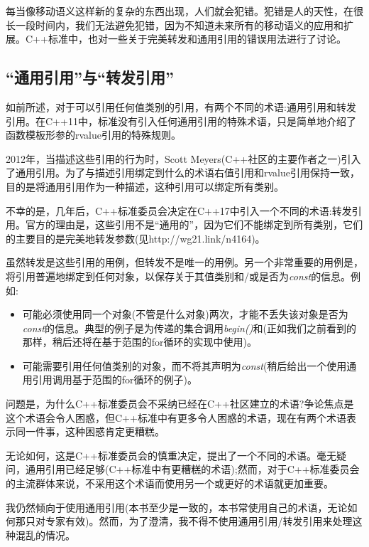 每当像移动语义这样新的复杂的东西出现，人们就会犯错。犯错是人的天性，在很长一段时间内，我们无法避免犯错，因为不知道未来所有的移动语义的应用和扩展。C++标准中，也对一些关于完美转发和通用引用的错误用法进行了讨论。

\subsection{“通用引用”与“转发引用”}

如前所述，对于可以引用任何值类别的引用，有两个不同的术语:通用引用和转发引用。在C++11中，标准没有引入任何通用引用的特殊术语，只是简单地介绍了函数模板形参的rvalue引用的特殊规则。

2012年，当描述这些引用的行为时，Scott Meyers(C++社区的主要作者之一)引入了通用引用。为了与描述引用绑定到什么的术语右值引用和rvalue引用保持一致，目的是将通用引用作为一种描述，这种引用可以绑定所有类别。

不幸的是，几年后，C++标准委员会决定在C++17中引入一个不同的术语:转发引用。官方的理由是，这些引用不是“通用的”，因为它们不能绑定到所有类别，它们的主要目的是完美地转发参数(见http://wg21.link/n4164)。

虽然转发是这些引用的用例，但转发不是唯一的用例。另一个非常重要的用例是，将引用普遍地绑定到任何对象，以保存关于其值类别和/或是否为\textit{const}的信息。例如:

\begin{itemize}
	\item 可能必须使用同一个对象(不管是什么对象)两次，才能不丢失该对象是否为\textit{const}的信息。典型的例子是为传递的集合调用\textit{begin()}和\textit{}(正如我们之前看到的那样，稍后还将在基于范围的for循环的实现中使用)。
	\item 可能需要引用任何值类别的对象，而不将其声明为\textit{const}(稍后给出一个使用通用引用调用基于范围的for循环的例子)。
\end{itemize}

问题是，为什么C++标准委员会不采纳已经在C++社区建立的术语?争论焦点是这个术语会令人困惑，但C++标准中有更多令人困惑的术语，现在有两个术语表示同一件事，这种困惑肯定更糟糕。

无论如何，这是C++标准委员会的慎重决定，提出了一个不同的术语。毫无疑问，通用引用已经足够(C++标准中有更糟糕的术语);然而，对于C++标准委员会的主流群体来说，不采用这个术语而使用另一个或更好的术语就更加重要。

我仍然倾向于使用通用引用(本书至少是一致的，本书常使用自己的术语，无论如何那只对专家有效)。然而，为了澄清，我不得不使用通用引用/转发引用来处理这种混乱的情况。

